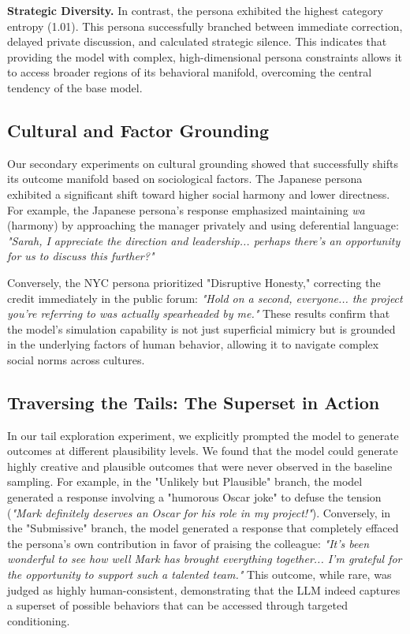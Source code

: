 {\bf Strategic Diversity.} In contrast, the \strategic persona exhibited the highest category entropy (1.01). This persona successfully branched between immediate correction, delayed private discussion, and calculated strategic silence. This indicates that providing the model with complex, high-dimensional persona constraints allows it to access broader regions of its behavioral manifold, overcoming the central tendency of the base model.

\subsection{Cultural and Factor Grounding}
Our secondary experiments on cultural grounding showed that \gpt successfully shifts its outcome manifold based on sociological factors. The Japanese persona exhibited a significant shift toward higher social harmony and lower directness. For example, the Japanese persona's response emphasized maintaining \textit{wa} (harmony) by approaching the manager privately and using deferential language: \textit{"Sarah, I appreciate the direction and leadership... perhaps there's an opportunity for us to discuss this further?"}

Conversely, the NYC persona prioritized "Disruptive Honesty," correcting the credit immediately in the public forum: \textit{"Hold on a second, everyone... the project you're referring to was actually spearheaded by me."} These results confirm that the model's simulation capability is not just superficial mimicry but is grounded in the underlying factors of human behavior, allowing it to navigate complex social norms across cultures.

\subsection{Traversing the Tails: The Superset in Action}
In our tail exploration experiment, we explicitly prompted the model to generate outcomes at different plausibility levels. We found that the model could generate highly creative and plausible outcomes that were never observed in the baseline sampling. For example, in the "Unlikely but Plausible" branch, the model generated a response involving a "humorous Oscar joke" to defuse the tension (\textit{"Mark definitely deserves an Oscar for his role in my project!"}). Conversely, in the "Submissive" branch, the model generated a response that completely effaced the persona's own contribution in favor of praising the colleague: \textit{"It's been wonderful to see how well Mark has brought everything together... I'm grateful for the opportunity to support such a talented team."} This outcome, while rare, was judged as highly human-consistent, demonstrating that the LLM indeed captures a superset of possible behaviors that can be accessed through targeted conditioning.

